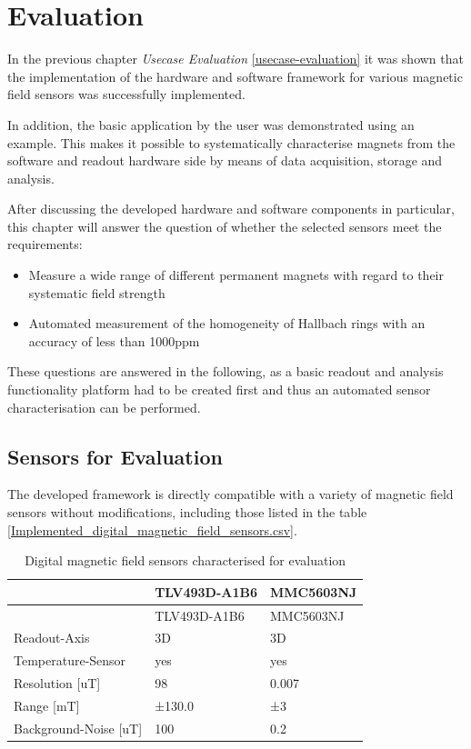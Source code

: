 \hypertarget{evaluation}{%
\chapter{Evaluation}\label{evaluation}}

In the previous chapter \emph{Usecase Evaluation}
\ref{usecase-evaluation} it was shown that the implementation of the
hardware and software framework for various magnetic field sensors was
successfully implemented.

In addition, the basic application by the user was demonstrated using an
example. This makes it possible to systematically characterise magnets
from the software and readout hardware side by means of data
acquisition, storage and analysis.

After discussing the developed hardware and software components in
particular, this chapter will answer the question of whether the
selected sensors meet the requirements:

\begin{itemize}
\tightlist
\item
  Measure a wide range of different permanent magnets with regard to
  their systematic field strength
\item
  Automated measurement of the homogeneity of Hallbach rings with an
  accuracy of less than 1000\gls{ppm}
\end{itemize}

These questions are answered in the following, as a basic readout and
analysis functionality platform had to be created first and thus an
automated sensor characterisation can be performed.

\hypertarget{sensors-for-evaluation}{%
\section{Sensors for Evaluation}\label{sensors-for-evaluation}}

The developed framework is directly compatible with a variety of
magnetic field sensors without modifications, including those listed in
the table \ref{Implemented_digital_magnetic_field_sensors.csv}.

\begin{longtable}[]{@{}lll@{}}
\caption{Digital magnetic field sensors characterised for evaluation
\label{Digital_magnetic_field_sensors_characterised_for_evaluation.csv}}\tabularnewline
\toprule
& TLV493D-A1B6 & MMC5603NJ\tabularnewline
\midrule
\endfirsthead
\toprule
& TLV493D-A1B6 & MMC5603NJ\tabularnewline
\midrule
\endhead
Readout-Axis & 3D & 3D\tabularnewline
Temperature-Sensor & yes & yes\tabularnewline
Resolution {[}uT{]} & 98 & 0.007\tabularnewline
Range {[}mT{]} & ±130.0 & ±3\tabularnewline
Background-Noise {[}uT{]} & 100 & 0.2\tabularnewline
\bottomrule
\end{longtable}

